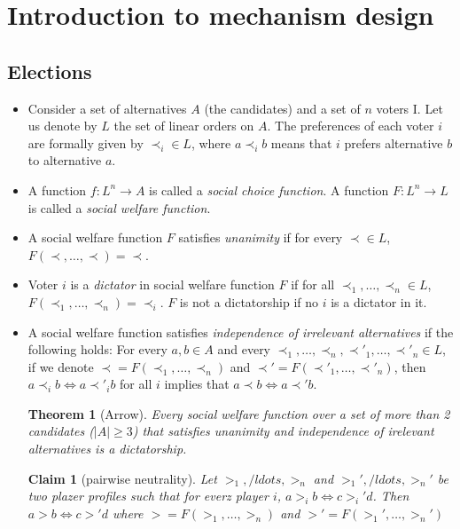 \documentclass{article}
\newtheorem{theorem}{Theorem}
\newtheorem{claim}{Claim}
\theoremstyle{definition}
\begin{document}
\section{Introduction to mechanism design}
\subsection{Elections}
\begin{itemize}
\item Consider a set of alternatives $A$ (the candidates) and a set of $n$ voters I.
Let us denote by $L$ the set of linear orders on $A$.
The preferences of each voter $i$ are formally given by $\prec_i \in  L$,
where $a\prec_i b$ means that $i$ prefers alternative $b$ to alternative $a$.

\item
A function $f: L^n\to  A$ is called a \emph{social choice function}.
A function $F: L^n\to L$ is called a \emph{social welfare function}.

\item
A social welfare function $F$ satisfies \emph{unanimity} if for every $\prec\in L$,
$F(\prec,\dots,\prec)=\prec$.

\item
Voter $i$ is a \emph{dictator} in social welfare function $F$ if for all $\prec_1,\dots,\prec_n\in L$,
$F(\prec_1,\dots,\prec_n)=\prec_i$.
$F$ is not a dictatorship if no $i$ is a dictator in it.

\item
A social welfare function satisfies \emph{independence of irrelevant alternatives}
if the following holds:
For every $a, b\in A$ and every $\prec_1,\dots,\prec_n,\prec'_1,\dots,\prec'_n\in L$,
if we denote $\prec=F(\prec_1,\dots,\prec_n)$ and $\prec'=F(\prec'_1,\dots,\prec'_n)$,
then $a\prec_i b \Leftrightarrow a\prec'_i b$ for all $i$ implies that
$a\prec b \Leftrightarrow a\prec' b$.

\begin{theorem}[Arrow]
Every social welfare function over a set of more than 2 candidates ($|A| \geq 3$) that satisfies
unanimity and independence of irelevant alternatives is a dictatorship.
\end{theorem}

\begin{claim}[pairwise neutrality]
Let $>_1, /ldots, >_n$ and $>_1', /ldots, >_n'$ be two plazer profiles such that for everz player
$i$, $a >_i b \Leftrightarrow c >_i' d$. Then $a > b \Leftrightarrow c >' d$ where
$> = F(>_1, \ldots, >_n)$ and $>' = F(>_1', \ldots, >_n')$
\end{claim}


\end{itemize}
\end{document}
